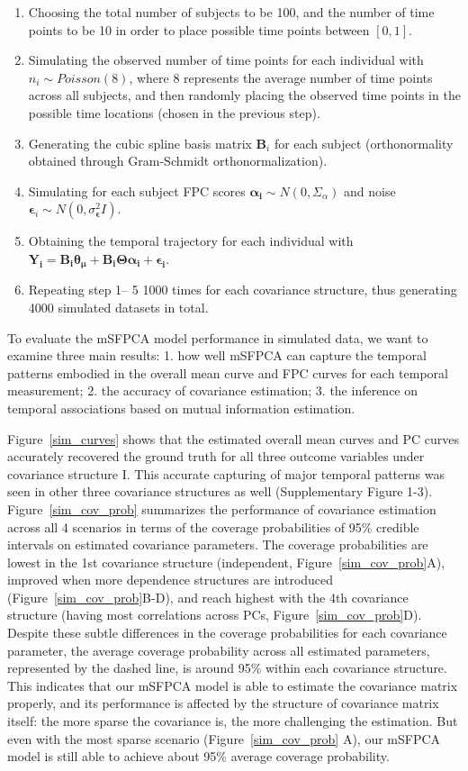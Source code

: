 \documentclass[aoas,preprint]{imsart}
\begin{document}
\begin{enumerate}
    \item Choosing the total number of subjects to be 100, and the number of time points to be 10 in order to place possible time points between $[0,1]$.
    \item  Simulating the observed number of time points for each individual with $n_i \sim Poisson (8)$, where 8 represents the average number  of time points
    across all subjects, and then randomly placing the observed time points in the possible time locations (chosen in the previous step).
    \item  Generating the cubic spline basis matrix $\boldsymbol B_i$ for each subject (orthonormality obtained through Gram-Schmidt orthonormalization).
    \item  Simulating for each subject FPC scores $\boldsymbol{\alpha_i} \sim N(0, \Sigma_\alpha)$ and noise $\boldsymbol\epsilon_i \sim N (0, \sigma_{\boldsymbol\epsilon}^2 I)$.
    \item Obtaining the temporal trajectory for each individual with $\boldsymbol{Y_i} = \boldsymbol{B_i \theta_\mu} + \boldsymbol{B_i \Theta \alpha_i} + \boldsymbol{\epsilon_i}$.
    \item Repeating step 1-- 5 1000 times for each covariance structure, thus generating 4000 simulated datasets in total.
\end{enumerate} 

To evaluate the mSFPCA model performance in simulated data, we want to examine three main results: 1. how well mSFPCA can capture the temporal patterns embodied in the overall mean curve and FPC curves for each temporal measurement; 2. the accuracy of covariance estimation; 3. the inference on temporal associations based on mutual information estimation. 

Figure~\ref{sim_curves} shows that the estimated overall mean curves and PC curves accurately recovered the ground truth for all three outcome variables under covariance structure I. This accurate capturing of major temporal patterns was seen in other three covariance structures as well (Supplementary Figure 1-3). Figure~\ref{sim_cov_prob} summarizes the performance of covariance estimation across all 4 scenarios in terms of the coverage probabilities of 95\% credible intervals on estimated covariance parameters. The coverage probabilities are lowest in the 1st covariance structure (independent, Figure~\ref{sim_cov_prob}A), improved when more dependence structures are introduced (Figure~\ref{sim_cov_prob}B-D), and reach highest with the 4th covariance structure (having most correlations across PCs, Figure~\ref{sim_cov_prob}D). Despite these subtle differences in the coverage probabilities for each covariance parameter, the average coverage probability across all estimated parameters, represented by the dashed line, is around 95\% within each covariance structure. This indicates that our mSFPCA model is able to estimate the covariance matrix properly, and its performance is affected by the structure of covariance matrix itself: the more sparse the covariance is, the more challenging the estimation. But even with the most sparse scenario (Figure~\ref{sim_cov_prob} A), our mSFPCA model is still able to achieve about 95\% average coverage probability. 
\end{document}

